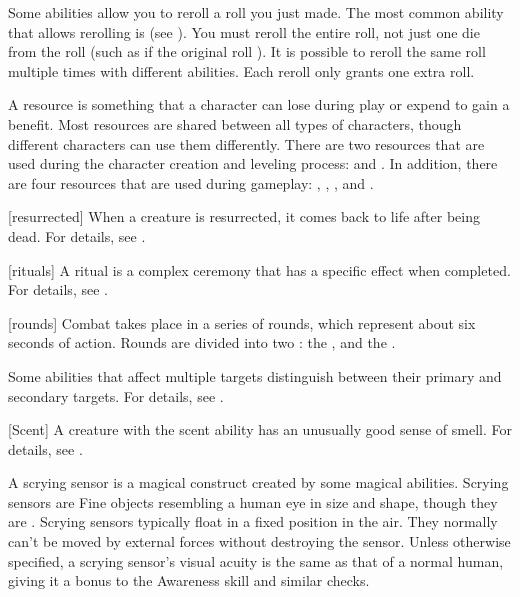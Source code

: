  Some abilities allow you to reroll a roll you just made.
The most common ability that allows rerolling is  (see ).
You must reroll the entire roll, not just one die from the roll (such as if the original roll ).
It is possible to reroll the same roll multiple times with different abilities.
Each reroll only grants one extra roll.

 A resource is something that a character can lose during play or expend to gain a benefit.
Most resources are shared between all types of characters, though different characters can use them differently.
There are two resources that are used during the character creation and leveling process:  and .
In addition, there are four resources that are used during gameplay: , , , and .

[resurrected] When a creature is resurrected, it comes back to life after being dead.
For details, see .

[rituals] A ritual is a complex \magical ceremony that has a specific effect when completed.
For details, see .

[rounds] Combat takes place in a series of rounds, which represent about six seconds of action.
Rounds are divided into two : the , and the .

 Some abilities that affect multiple targets distinguish between their primary and secondary targets.
For details, see .

[Scent] A creature with the scent ability has an unusually good sense of smell.
For details, see .

 A scrying sensor is a magical construct created by some magical abilities.
Scrying sensors are Fine objects resembling a human eye in size and shape, though they are .
Scrying sensors typically float in a fixed position in the air.
They normally can't be moved by external forces without destroying the sensor.
Unless otherwise specified, a scrying sensor's visual acuity is the same as that of a normal human, giving it a  bonus to the Awareness skill and similar checks.

